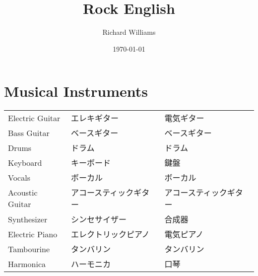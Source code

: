 \documentclass[11pt]{article}
\author{Richard Williams}
\date{\today}
\title{Rock English}
\begin{document}
\maketitle
\usepackage{fontenc}

\section*{Musical Instruments}
\label{sec:orgd36fda6}
\begin{center}
\begin{tabular}{lll}
Electric Guitar & エレキギター & 電気ギター\\[0pt]
Bass Guitar & ベースギター & ベースギター\\[0pt]
Drums & ドラム & ドラム\\[0pt]
Keyboard & キーボード & 鍵盤\\[0pt]
Vocals & ボーカル & ボーカル\\[0pt]
Acoustic Guitar & アコースティックギター & アコースティックギター\\[0pt]
Synthesizer & シンセサイザー & 合成器\\[0pt]
Electric Piano & エレクトリックピアノ & 電気ピアノ\\[0pt]
Tambourine & タンバリン & タンバリン\\[0pt]
Harmonica & ハーモニカ & 口琴\\[0pt]
\end{tabular}
\end{center}
\end{document}

